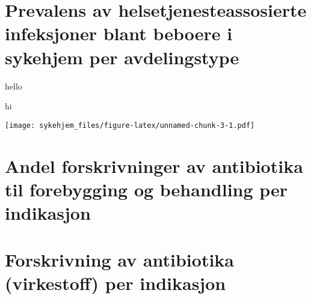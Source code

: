\documentclass[a4paper,12pt]{article}
\begin{document}
\newpage

\section{Prevalens av helsetjenesteassosierte infeksjoner blant beboere
i sykehjem per
avdelingstype}\label{prevalens-av-helsetjenesteassosierte-infeksjoner-blant-beboere-i-sykehjem-per-avdelingstype}

\blindtext

hello

hi

\texttt{[image: sykehjem\_files/figure-latex/unnamed-chunk-3-1.pdf]}

\newpage

\section{Andel forskrivninger av antibiotika til forebygging og
behandling per
indikasjon}\label{andel-forskrivninger-av-antibiotika-til-forebygging-og-behandling-per-indikasjon}

\blindtext

\newpage

\section{Forskrivning av antibiotika (virkestoff) per
indikasjon}\label{forskrivning-av-antibiotika-virkestoff-per-indikasjon}

\blindtext
\end{document}
